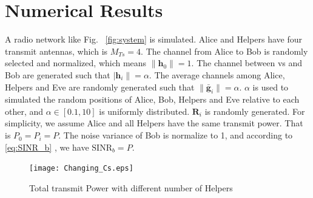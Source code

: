 \documentclass[conference]{IEEEtran}
\begin{document}
%

\section{Numerical Results} \label{sec:numerical results}
A radio network like Fig. ~\ref{fig:system} is simulated. Alice and Helpers have four transmit antennas, which is $M_{Ts}= 4$. The channel from Alice to Bob is randomly selected and normalized, which means $\|\mathbf{h}_0\| = 1$. The channel between vs and Bob are generated such that $|\mathbf{h}_i\| = \alpha$.  The average channels among Alice, Helpers  and Eve are randomly generated such that $\|\bar{\mathbf{g}}_i\| = \alpha$. $\alpha$ is used to simulated the random positions of Alice, Bob, Helpers and Eve relative to each other, and $\alpha \in  [0.1,10]$ is uniformly distributed.  $\mathbf{R}_i$ is randomly generated. %
For simplicity, we assume Alice and all Helpers have the same transmit power. That is $P_0=P_i = P$. The noise variance of Bob is normalize to 1,  and according to \eqref{eq:SINR_b} , we have $\mathrm{SINR}_b = P$.


\begin{figure}[ht]
	\centering
	\texttt{[image: Changing\_Cs.eps]} %
	\caption{Total transmit Power with different number of Helpers}
	\label{fig:Changing_Cs}
\end{figure}
\end{document}
